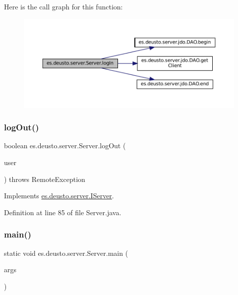 Here is the call graph for this function\+:
\nopagebreak
\begin{figure}[H]
\begin{center}
\leavevmode
\includegraphics[width=350pt]{classes_1_1deusto_1_1server_1_1_server_ab93f5cc9b5825192c31cd2088014378d_cgraph}
\end{center}
\end{figure}
\mbox{\label{classes_1_1deusto_1_1server_1_1_server_a92cf8a599adfa6a34f7cfe788119cf0a}} 
\subsubsection{\texorpdfstring{logOut()}{logOut()}}
{\footnotesize\ttfamily boolean es.\+deusto.\+server.\+Server.\+log\+Out (\begin{DoxyParamCaption}\item[{\mbox{\hyperlink{classes_1_1deusto_1_1server_1_1data_1_1_user_d_t_o}{User\+D\+TO}}}]{user }\end{DoxyParamCaption}) throws Remote\+Exception}



Implements \mbox{\hyperlink{interfacees_1_1deusto_1_1server_1_1_i_server_a479231082cae13f9c651c0ec2cb2cece}{es.\+deusto.\+server.\+I\+Server}}.



Definition at line 85 of file Server.\+java.

\mbox{\label{classes_1_1deusto_1_1server_1_1_server_a750bb0d7dbd89246a3602f2e20d03fb5}} 
\subsubsection{\texorpdfstring{main()}{main()}}
{\footnotesize\ttfamily static void es.\+deusto.\+server.\+Server.\+main (\begin{DoxyParamCaption}\item[{String \mbox{[}$\,$\mbox{]}}]{args }\end{DoxyParamCaption})\hspace{0.3cm}{\ttfamily [static]}}



